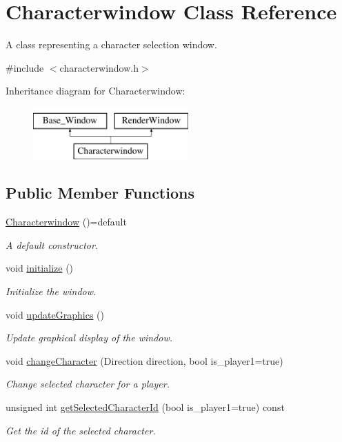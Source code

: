 \hypertarget{classCharacterwindow}{}\section{Characterwindow Class Reference}
\label{classCharacterwindow}


A class representing a character selection window.  




{\ttfamily \#include $<$characterwindow.\+h$>$}

Inheritance diagram for Characterwindow\+:\begin{figure}[H]
\begin{center}
\leavevmode
\includegraphics[height=2.000000cm]{classCharacterwindow}
\end{center}
\end{figure}
\subsection*{Public Member Functions}
\begin{DoxyCompactItemize}
\item 
\hyperlink{classCharacterwindow_a2f9d2f2231c33265918bc9697f03c894}{Characterwindow} ()=default
\begin{DoxyCompactList}\small\item\em A default constructor. \end{DoxyCompactList}\item 
void \hyperlink{classCharacterwindow_a0e7738c002afb23bb1d571d5d4f1dd1d}{initialize} ()
\begin{DoxyCompactList}\small\item\em Initialize the window. \end{DoxyCompactList}\item 
void \hyperlink{classCharacterwindow_aaca1dea6e04dbd2843907d652dcf2fb0}{update\+Graphics} ()
\begin{DoxyCompactList}\small\item\em Update graphical display of the window. \end{DoxyCompactList}\item 
void \hyperlink{classCharacterwindow_a3e74d9d40166eb88e2259f4f0d1da2ab}{change\+Character} (Direction direction, bool is\+\_\+player1=true)
\begin{DoxyCompactList}\small\item\em Change selected character for a player. \end{DoxyCompactList}\item 
unsigned int \hyperlink{classCharacterwindow_a9af7aeece3281823e2e972beb797283a}{get\+Selected\+Character\+Id} (bool is\+\_\+player1=true) const
\begin{DoxyCompactList}\small\item\em Get the id of the selected character. \end{DoxyCompactList}\end{DoxyCompactItemize}
